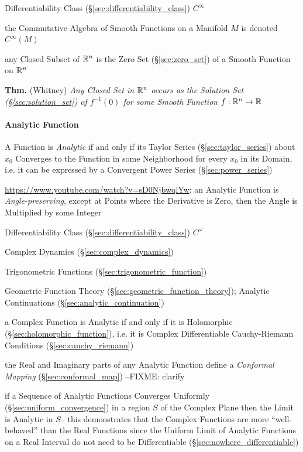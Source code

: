 {Differentiability Class (\S\ref{sec:differentiability_class}) $C^{\infty}$

the Commutative Algebra of Smooth Functions on a Manifold $M$ is denoted
$C^\infty(M)$ %

any Closed Subset of $\mathbb{R}^n$ is the Zero Set (\S\ref{sec:zero_set}) of a
Smooth Function on $\mathbb{R}^n$

\textbf{Thm.} (Whitney) \emph{Any Closed Set in $\mathbb{R}^n$ occurs as the
  Solution Set (\S\ref{sec:solution_set}) of $f^{-1}(0)$ for some Smooth
  Function $f : \mathbb{R}^n \rightarrow \mathbb{R}$}



\paragraph{Analytic Function}\label{sec:analytic_function}\hfill

A Function is \emph{Analytic} if and only if its Taylor Series
(\S\ref{sec:taylor_series}) about $x_0$ Converges to the Function in some
Neighborhood for every $x_0$ in its Domain, i.e. it can be expressed by a
Convergent Power Series (\S\ref{sec:power_series})

\url{https://www.youtube.com/watch?v=sD0NjbwqlYw}: an Analytic Function is
\emph{Angle-preserving}, except at Points where the Derivative is Zero, then the
Angle is Multiplied by some Integer

Differentiability Class (\S\ref{sec:differentiability_class}) $C^{\omega}$

Complex Dynamics (\S\ref{sec:complex_dynamics})

Trigonometric Functions (\S\ref{sec:trigonometric_function})

\fist Geometric Function Theory (\S\ref{sec:geometric_function_theory});
Analytic Continuations (\S\ref{sec:analytic_continuation})

a Complex Function is Analytic if and only if it is Holomorphic
(\S\ref{sec:holomorphic_function}), i.e. it is Complex Differentiable \fist
Cauchy-Riemann Conditions (\S\ref{sec:cauchy_riemann})

the Real and Imaginary parts of any Analytic Function define a \emph{Conformal
  Mapping} (\S\ref{sec:conformal_map}) --FIXME: clarify

if a Sequence of Analytic Functions Converges Uniformly
(\S\ref{sec:uniform_convergence}) in a region $S$ of the Complex Plane then the
Limit is Analytic in $S$-- this demonstrates that the Complex Functions are
more ``well-behaved'' than the Real Functions since the Uniform Limit of
Analytic Functions on a Real Interval do not need to be Differentiable
(\S\ref{sec:nowhere_differentiable})

}
